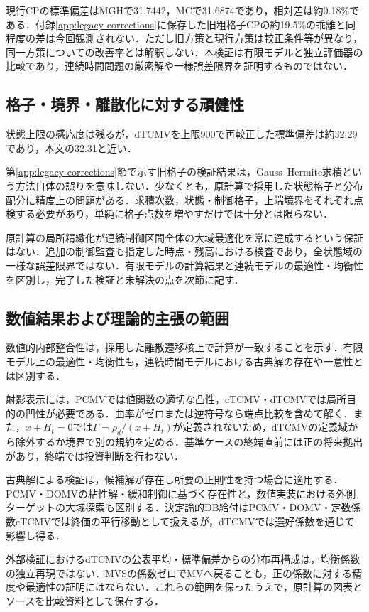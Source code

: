 \documentclass[10pt,a4paper]{article}
\theoremstyle{plain}
\theoremstyle{definition}
\begin{document}
現行CPの標準偏差はMGHで31.7442，MCで31.6874であり，相対差は約0.18\%である．付録\ref{app:legacy-corrections}に保存した旧粗格子CPの約19.5\%の乖離と同程度の差は今回観測されない．ただし旧方策と現行方策は較正条件等が異なり，同一方策についての改善率とは解釈しない．本検証は有限モデルと独立評価器の比較であり，連続時間問題の厳密解や一様誤差限界を証明するものではない．

\clearpage
\subsection{格子・境界・離散化に対する頑健性}\label{app:validation-robustness}
状態上限の感応度は残るが，dTCMVを上限900で再較正した標準偏差は約32.29であり，本文の32.31と近い．

第\ref{app:legacy-corrections}節で示す旧格子の検証結果は，Gauss--Hermite求積という方法自体の誤りを意味しない．少なくとも，原計算で採用した状態格子と分布配分に精度上の問題がある．求積次数，状態・制御格子，上端境界をそれぞれ点検する必要があり，単純に格子点数を増やすだけでは十分とは限らない．

原計算の局所精緻化が連続制御区間全体の大域最適化を常に達成するという保証はない．追加の制御監査も指定した時点・残高における検査であり，全状態域の一様な誤差限界ではない．有限モデルの計算結果と連続モデルの最適性・均衡性を区別し，完了した検証と未解決の点を次節に記す．

\subsection{数値結果および理論的主張の範囲}\label{app:validation-scope}
数値的内部整合性は，採用した離散遷移核上で計算が一致することを示す．有限モデル上の最適性・均衡性も，連続時間モデルにおける古典解の存在や一意性とは区別する．

射影表示には，PCMVでは値関数の適切な凸性，cTCMV・dTCMVでは局所目的の凹性が必要である．曲率がゼロまたは逆符号なら端点比較を含めて解く．また，$x+H_t=0$では$\Gamma=\rho_d/(x+H_t)$が定義されないため，dTCMVの定義域から除外するか境界で別の規約を定める．基準ケースの終端直前には正の将来拠出があり，終端では投資判断を行わない．

古典解による検証は，候補解が存在し所要の正則性を持つ場合に適用する．PCMV・DOMVの粘性解・緩和制御に基づく存在性と，数値実装における外側ターゲットの大域探索も区別する．決定論的DB給付はPCMV・DOMV・定数係数cTCMVでは終価の平行移動として扱えるが，dTCMVでは選好係数を通じて影響し得る．

外部検証におけるdTCMVの公表平均・標準偏差からの分布再構成は，均衡係数の独立再現ではない．MVSの係数ゼロでMVへ戻ることも，正の係数に対する精度や最適性の証明にはならない．これらの範囲を保ったうえで，原計算の図表とソースを比較資料として保存する．
\end{document}
